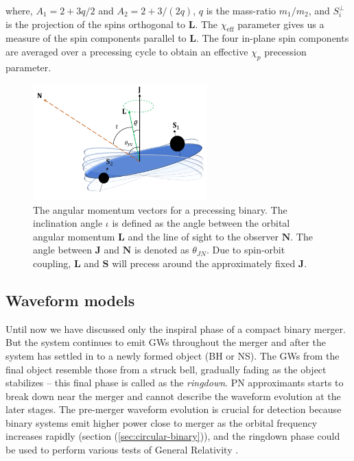 where, $A_1=2+3q/2$ and $A_2 = 2 + 3/(2q)$, $q$ is the mass-ratio $m_1/m_2$, and $S_i^{\perp}$ is the projection of the spins orthogonal to $\textbf{L}$. The $\chi_{\text{eff}}$ parameter gives us a measure of the spin components parallel to $\textbf{L}$. The four in-plane spin components are averaged over a precessing cycle to obtain an effective $\chi_p$ precession parameter.

\begin{figure}
    \centering
    \includegraphics[width=0.6\textwidth]{figures/Introduction/Precessing_angles-new.png}
    \caption{The angular momentum vectors for a precessing binary. The inclination angle $\iota$ is defined as the angle between the orbital angular momentum $\textbf{L}$ and the line of sight to the observer $\textbf{N}$. The angle between $\textbf{J}$ and $\textbf{N}$ is denoted as $\theta_{JN}$. Due to spin-orbit coupling, $\textbf{L}$ and $\textbf{S}$ will precess around the approximately fixed $\textbf{J}$.}
    \label{fig:precessing_angles}
\end{figure}

\subsection{Waveform models}
Until now we have discussed only the inspiral phase of a compact binary merger. But the system continues to emit GWs throughout the merger and after the system has settled in to a newly formed object (BH or NS). The GWs from the final object  resemble those from a struck bell, gradually fading as the object stabilizes -- this final phase is called as the \textit{ringdown}. PN approximants starts to break down near the merger and cannot describe the waveform evolution at the later stages. The pre-merger waveform evolution is crucial for detection because binary systems emit higher power close to merger as the orbital frequency increases rapidly (section (\ref{sec:circular-binary})), and the ringdown phase could be used to perform various tests of General Relativity \cite{Dreyer:2003bv}. 

